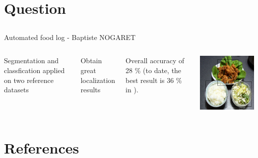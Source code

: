 \documentclass[aspectratio=169]{beamer}
\let\oldsection\section
\renewcommand{\section}[1]{
    \oldsection{#1}	
    \subsection{}
}
\newenvironment{myframe}[1][t]{\begin{frame}[#1]{\secname}{\subsecname}}{\end{frame}}
\begin{document}
     \section{Question}
    
    {
        \begin{frame}{Automated food log - Baptiste NOGARET}{}
            \begin{columns}
                Segmentation and classfication applied on two reference datasets
                
                \vspace{0.5cm}
                
                Obtain great localization results
                
                \vspace{0.5cm}
                
                Overall accuracy of 28 \% (to date, the best result is 36 \% in \cite{Bolanos2016}).
                
                \centering
                \includegraphics[scale=0.5]{../img/seg_97_gt}
            \end{columns}
        \end{frame}
    }
    
    \section{References}
    
    \begin{myframe}[t, allowframebreaks]
        \printbibliography[heading=none]
    \end{myframe}
   
\end{document}
